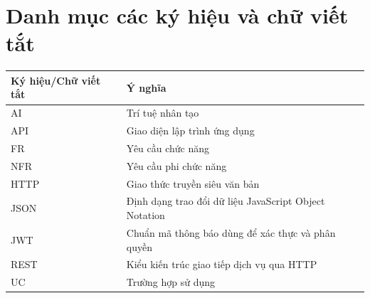 \clearpage
{}
{}
\tableofcontents

\clearpage
{}
{}
\listoftables

\clearpage
{}
{}
\listoffigures

\clearpage
{}
{}
\chapter*{Danh mục các ký hiệu và chữ viết tắt}
\begin{center}
\renewcommand{\arraystretch}{1.3}
\setlength{\tabcolsep}{6pt}
\begin{tabular}{|L{3.2cm}|L{9.2cm}|}
\hline
\centering\arraybackslash\textbf{Ký hiệu/Chữ viết tắt} & \centering\arraybackslash\textbf{Ý nghĩa} \\
\hline
AI & Trí tuệ nhân tạo \\
\hline
API & Giao diện lập trình ứng dụng \\
\hline
FR & Yêu cầu chức năng \\
\hline
NFR & Yêu cầu phi chức năng \\
\hline
HTTP & Giao thức truyền siêu văn bản \\
\hline
JSON & Định dạng trao đổi dữ liệu JavaScript Object Notation \\
\hline
JWT & Chuẩn mã thông báo dùng để xác thực và phân quyền \\
\hline
REST & Kiểu kiến trúc giao tiếp dịch vụ qua HTTP \\
\hline
UC & Trường hợp sử dụng \\
\hline
\end{tabular}
\end{center}
